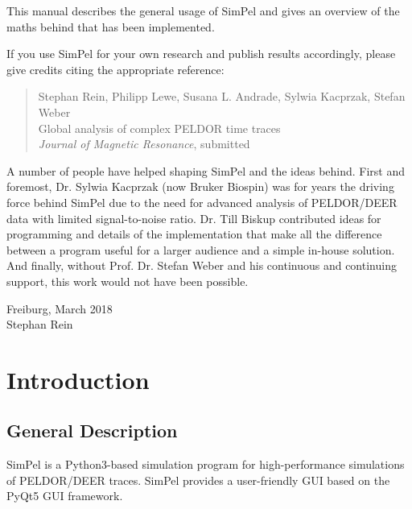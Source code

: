 \documentclass[pdftex,bezier,german,a4,twoside, headexclude,12pt,nochapterprefix, titlepage]{extarticle}
\newcommand{\simpel}{\textsf{SimPel}}
\begin{document}
This manual describes the general usage of \simpel{} and gives an overview of the maths behind that has been implemented.

If you use \simpel{} for your own research and publish results accordingly, please give credits citing the appropriate reference:

\begin{quote}\small
Stephan Rein, Philipp Lewe, Susana L. Andrade, Sylwia Kacprzak, Stefan Weber
\\
Global analysis of complex PELDOR time traces
\\
\emph{Journal of Magnetic Resonance}, submitted 
\end{quote}



A number of people have helped shaping \simpel{} and the ideas behind. First and foremost, Dr. Sylwia Kacprzak (now Bruker Biospin) was for years the driving force behind \simpel{} due to the need for advanced analysis of PELDOR/DEER data with limited signal-to-noise ratio. Dr. Till Biskup contributed ideas for programming and details of the implementation that make all the difference between a program useful for a larger audience and a simple in-house solution. And finally, without Prof. Dr. Stefan Weber and his continuous and continuing support, this work would not have been possible.

\vspace*{2em}

\begin{flushright}
Freiburg, March 2018\\
Stephan Rein
\end{flushright}

\clearpage


\section{Introduction}

\subsection{General Description}

\simpel{} is a Python3-based simulation program for high-performance simulations of PELDOR/DEER traces. \simpel{} provides a user-friendly GUI based on the PyQt5 GUI framework.
\end{document}
